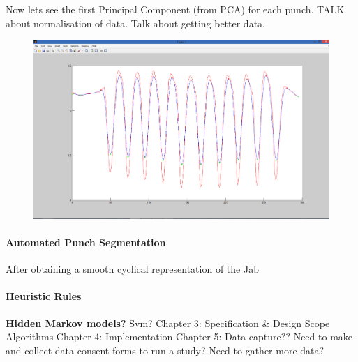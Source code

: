 Now lets see the first Principal Component (from PCA) for each punch.
TALK about normalisation of data.
Talk about getting better data.

\begin{figure}[h]
    \centering
    \includegraphics[height=0.25\textheight]{fig04/fig10}
    \label{fig:kinect}
\end{figure}


\paragraph{Automated Punch Segmentation}
After obtaining a smooth cyclical representation of the Jab




\paragraph{Heuristic Rules}



{\bf Hidden Markov models?}
Svm?\newline
Chapter 3: Specification \& Design\newline
Scope Algorithms\newline
Chapter 4: Implementation\newline
Chapter 5: Data capture??\newline
Need to make and collect data consent forms to run a study?\newline
Need to gather more data?\newline

